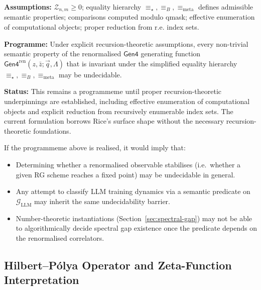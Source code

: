 \begin{notation}
\label{not:speculative-programme}
\begin{conjecture}
\label{conj:generalised-rice}
\textbf{Assumptions:} $\mathcal{Z}_{n,m}\ge0$; equality hierarchy $\equiv_\star, \equiv_B, \equiv_{\text{meta}}$ defines admissible semantic properties; comparisons computed modulo qmask; effective enumeration of computational objects; proper reduction from r.e. index sets.

\textbf{Programme:} Under explicit recursion-theoretic assumptions, every non-trivial semantic property of the renormalised $\mathsf{Gen4}$ generating function $\mathsf{Gen4}^{\text{ren}}(z,\bar{z};\vec q,\Lambda)$ that is invariant under the simplified equality hierarchy $\equiv_\star, \equiv_B, \equiv_{\text{meta}}$ may be undecidable.

\textbf{Status:} This remains a programmeme until proper recursion-theoretic underpinnings are established, including effective enumeration of computational objects and explicit reduction from recursively enumerable index sets. The current formulation borrows Rice's surface shape without the necessary recursion-theoretic foundations.
\end{conjecture}

\begin{corollary}
If the programmeme above is realised, it would imply that:
\begin{itemize}
  \item Determining whether a renormalised observable stabilises (i.e.\ whether a given RG scheme reaches a fixed point) may be undecidable in general.
  \item Any attempt to classify LLM training dynamics via a semantic predicate on $\mathcal{G}_{\text{LLM}}$ may inherit the same undecidability barrier.
  \item Number-theoretic instantiations (Section~\ref{sec:spectral-gap}) may not be able to algorithmically decide spectral gap existence once the predicate depends on the renormalised correlators.
\end{itemize}
\end{corollary}
\end{notation}

\subsection{Hilbert–Pólya Operator and Zeta-Function Interpretation}


